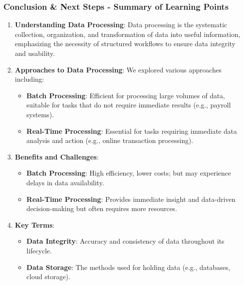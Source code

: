 \documentclass{beamer}
\begin{document}
\begin{frame}[fragile]
    \frametitle{Conclusion \& Next Steps - Summary of Learning Points}
    \begin{enumerate}
        \item \textbf{Understanding Data Processing}:
              Data processing is the systematic collection, organization, and transformation of data into useful information, emphasizing the necessity of structured workflows to ensure data integrity and usability.
              
        \item \textbf{Approaches to Data Processing}:
              We explored various approaches including:
              \begin{itemize}
                  \item \textbf{Batch Processing}: Efficient for processing large volumes of data, suitable for tasks that do not require immediate results (e.g., payroll systems).
                  \item \textbf{Real-Time Processing}: Essential for tasks requiring immediate data analysis and action (e.g., online transaction processing).
              \end{itemize}
              
        \item \textbf{Benefits and Challenges}:
              \begin{itemize}
                  \item \textbf{Batch Processing}: High efficiency, lower costs; but may experience delays in data availability.
                  \item \textbf{Real-Time Processing}: Provides immediate insight and data-driven decision-making but often requires more resources.
              \end{itemize}
              
        \item \textbf{Key Terms}:
              \begin{itemize}
                  \item \textbf{Data Integrity}: Accuracy and consistency of data throughout its lifecycle.
                  \item \textbf{Data Storage}: The methods used for holding data (e.g., databases, cloud storage).
              \end{itemize}
    \end{enumerate}
\end{frame}
\end{document}
